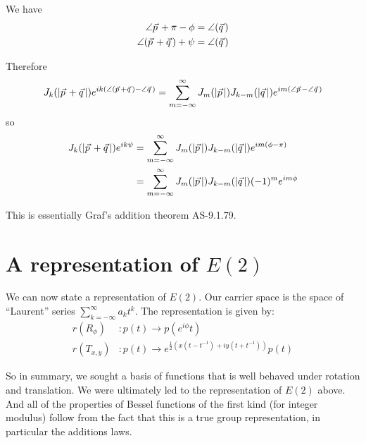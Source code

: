 \documentclass{article}
\newcommand\myvec[1]{\vec{#1}\hspace{0.5mm}}
\begin{document}
We have
\begin{align*}
\angle\myvec{p}+\pi-\phi & = \angle(\myvec{q}) \\
\angle(\myvec{p}+\myvec{q})+\psi & = \angle(\myvec{q}) 
\end{align*}

Therefore
\[
J_k(|\myvec{p}+\myvec{q}|)e^{ik(\angle(\myvec{p}+\myvec{q})-\angle\myvec{q})} = \sum_{m=-\infty}^\infty J_m(|\myvec{p}|)J_{k-m}(|\myvec{q}|)e^{im(\angle\myvec{p}-\angle\myvec{q})}
\]
so
\begin{align*}
J_k(|\myvec{p}+\myvec{q}|)e^{ik\psi} & = \sum_{m=-\infty}^\infty J_m(|\myvec{p}|)J_{k-m}(|\myvec{q}|)e^{im(\phi-\pi)} \\
                                 & = \sum_{m=-\infty}^\infty J_m(|\myvec{p}|)J_{k-m}(|\myvec{q}|)(-1)^me^{im\phi}
\end{align*}

This is essentially Graf's addition theorem AS-9.1.79.

\section{A representation of $E(2)$}
We can now state a representation of $E(2)$.
Our carrier space is the space of ``Laurent'' series $\sum_{k=-\infty}^\infty a_kt^k$.
The representation is given by:
\begin{align*}
r(R_\phi) & : p(t) \rightarrow p(e^{i\phi}t)\\
r(T_{x,y}) & : p(t) \rightarrow e^{\frac{1}{2}(x(t-t^{-1})+iy(t+t^{-1}))}p(t)
\end{align*}

So in summary, we sought a basis of functions that is well behaved under rotation and translation.
We were ultimately led to the representation of $E(2)$ above.
And all of the properties of Bessel functions of the first kind (for integer modulus) follow from the fact that this is a true group representation, in particular the additions laws.
\end{document}
